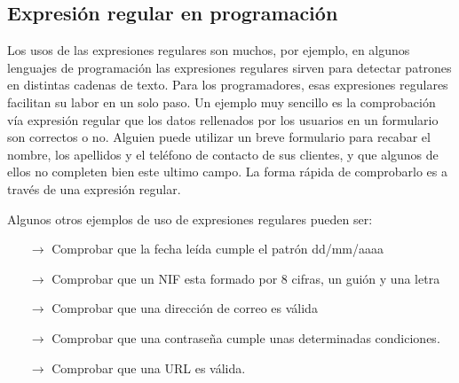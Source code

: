 \documentclass[12pt]{article}
\begin{document}
	\subsection{Expresión regular en programación}

	Los usos de las expresiones regulares son muchos, por ejemplo, en algunos lenguajes de programación
	las expresiones regulares sirven para detectar patrones en distintas cadenas de texto. Para los
	programadores, esas expresiones regulares facilitan su labor en un solo paso. Un ejemplo muy sencillo
	es la comprobación vía expresión regular que los datos rellenados por los usuarios en un formulario 
	son correctos o no. Alguien puede utilizar un breve formulario para recabar el nombre, los apellidos 
	y el teléfono de contacto de sus clientes, y que algunos de ellos no completen bien este ultimo campo.
	La forma rápida de comprobarlo es a través de una expresión regular.

	Algunos otros ejemplos de uso de expresiones regulares pueden ser:

	\begin{itemize}
		\item[$\rightarrow$] Comprobar que la fecha leída cumple el patrón dd/mm/aaaa
		\item[$\rightarrow$] Comprobar que un NIF esta formado por 8 cifras, un guión y una letra
		\item[$\rightarrow$] Comprobar que una dirección de correo es válida
		\item[$\rightarrow$] Comprobar que una contraseña cumple unas determinadas condiciones.
		\item[$\rightarrow$] Comprobar que una URL es válida.
	\end{itemize} 
\end{document}
